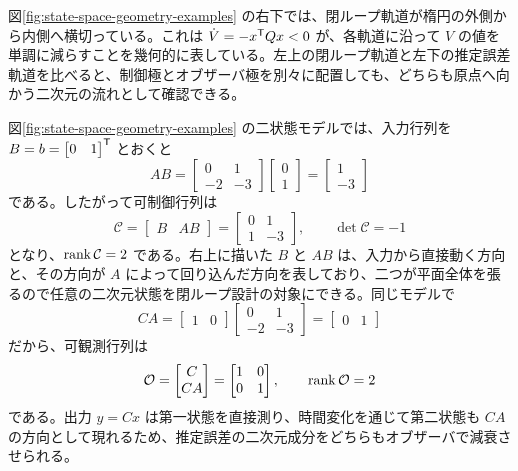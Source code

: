 図\ref{fig:state-space-geometry-examples} の右下では、閉ループ軌道が楕円の外側から内側へ横切っている。これは $\dot{V}=-x^{\mathsf{T}} Qx<0$ が、各軌道に沿って $V$ の値を単調に減らすことを幾何的に表している。左上の閉ループ軌道と左下の推定誤差軌道を比べると、制御極とオブザーバ極を別々に配置しても、どちらも原点へ向かう二次元の流れとして確認できる。

図\ref{fig:state-space-geometry-examples} の二状態モデルでは、入力行列を $B=b=\begin{bmatrix}0&1\end{bmatrix}^{\mathsf{T}}$ とおくと
\begin{equation}
  AB=
  \begin{bmatrix}0&1\\-2&-3\end{bmatrix}
  \begin{bmatrix}0\\1\end{bmatrix}
  =
  \begin{bmatrix}1\\-3\end{bmatrix}
\end{equation}
である。したがって可制御行列は
\begin{equation}
  \mathcal{C}=\begin{bmatrix}B&AB\end{bmatrix}
  =
  \begin{bmatrix}0&1\\1&-3\end{bmatrix},\qquad
  \det\mathcal{C}=-1
\end{equation}
となり、$\operatorname{rank}\mathcal{C}=2$ である。右上に描いた $B$ と $AB$ は、入力から直接動く方向と、その方向が $A$ によって回り込んだ方向を表しており、二つが平面全体を張るので任意の二次元状態を閉ループ設計の対象にできる。同じモデルで
\begin{equation}
  CA=
  \begin{bmatrix}1&0\end{bmatrix}
  \begin{bmatrix}0&1\\-2&-3\end{bmatrix}
  =
  \begin{bmatrix}0&1\end{bmatrix}
\end{equation}
だから、可観測行列は
\begin{equation}
  \mathcal{O}=\begin{bmatrix}C\\CA\end{bmatrix}
  =
  \begin{bmatrix}1&0\\0&1\end{bmatrix},\qquad
  \operatorname{rank}\mathcal{O}=2
\end{equation}
である。出力 $y=Cx$ は第一状態を直接測り、時間変化を通じて第二状態も $CA$ の方向として現れるため、推定誤差の二次元成分をどちらもオブザーバで減衰させられる。

